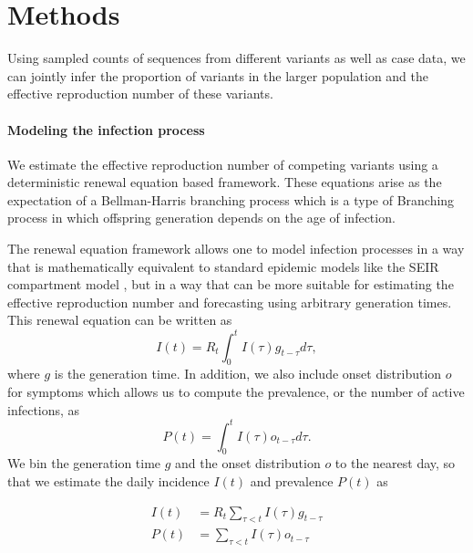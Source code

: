 \documentclass[11pt,oneside,letterpaper]{article}
\begin{document}
\section*{Methods}

Using sampled counts of sequences from different variants as well as case data, we can jointly infer the proportion of variants in the larger population and the effective reproduction number of these variants.

\paragraph{Modeling the infection process}%

We estimate the effective reproduction number of competing variants using a deterministic renewal equation based framework. These equations arise as the expectation of a Bellman-Harris branching process \cite{Bellman1948} which is a type of Branching process in which offspring generation depends on the age of infection.

The renewal equation framework allows one to model infection processes in a way that is mathematically equivalent to standard epidemic models like the SEIR compartment model \cite{Champredon2018}, but in a way that can be more suitable for estimating the effective reproduction number and forecasting using arbitrary generation times. This renewal equation can be written as
\begin{equation}
  I(t) = R_{t} \int_{0}^{t} I(\tau)g_{t-\tau} d\tau,
\end{equation}
where $g$ is the generation time.
In addition, we also include onset distribution $o$ for symptoms which allows us to compute the prevalence, or the number of active infections, as
\begin{equation}
  P(t) = \int_{0}^{t} I(\tau) o_{t-\tau} d \tau.
\end{equation}
We bin the generation time $g$ and the onset distribution $o$ to the nearest day, so that we estimate the daily incidence $I(t)$ and prevalence $P(t)$ as

\begin{align}
  I(t) &= R_{t} \sum_{\tau < t} I(\tau) g_{t-\tau}\\
  P(t) &= \sum_{\tau < t} I(\tau) o_{t-\tau}
\end{align}
\end{document}
